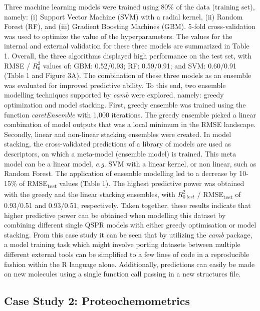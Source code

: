 \documentclass[twoside,a4wide,10pt]{article}
\begin{document}
Three machine learning models were trained using 80\% of the
data (training set), namely: 
(i) Support Vector Machine (SVM) with a radial kernel,
(ii) Random Forest (RF), and
(iii) Gradient Boosting Machines (GBM).
5-fold cross-validation was used to optimize the value of the hyperparameters.
The values for the internal and external validation for these three models are summarized in Table 1.
Overall, the three algorithms displayed high performance on the test set,
with RMSE / $R^{2}_{0}$ values of:  GBM: 0.52/0.93; RF: 0.59/0.91; and SVM: 0.60/0.91  (Table 1 and Figure 3A). 
The combination of these three models as an ensemble was evaluated for improved predictive ability.
To this end, two ensemble modelling techniques supported by {\it camb} were explored,
namely: greedy optimization and model stacking.
First, greedy ensemble was trained using the function {\it caretEnsemble} with 1,000 iterations. 
The greedy ensemble picked a linear combination of model outputs that was a local minimum in the RMSE landscape. 
Secondly, linear and non-linear stacking ensembles were created.
In model stacking, the cross-validated predictions of a library of models are used as descriptors,
on which a meta-model (ensemble model) is trained.
This meta model can be a linear model, {\it e.g.} SVM with a linear kernel,
or non linear, such as Random Forest.
The application of ensemble modelling led to a decrease by 10-15\%
of RMSE\textsubscript{test} values (Table 1).
The highest predictive power was obtained with the greedy and the linear stacking ensembles,
with $R^{2}_{0\ test}$ / RMSE\textsubscript{test} of 0.93/0.51 and 0.93/0.51, respectively.
Taken together, these results indicate that higher predictive power can be obtained when modelling this dataset
by combining different single QSPR models with either greedy optimisation or model stacking.
From this case study it can be seen that by utilizing the \textit{camb} package, a model training task which might involve
porting datasets between multiple different external tools can be simplified to a few lines of code in a reproducible fashion within the R language alone. Additionally, predictions can easily be made on new molecules using a single function call passing in a new structures file.

\subsection{Case Study 2: Proteochemometrics}
\end{document}
